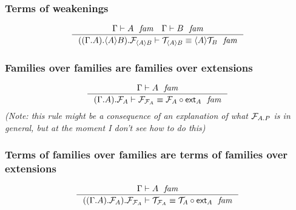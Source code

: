 \subsubsection{Terms of weakenings}
\begin{equation*}
\inference
  { \jfam{\Gamma}{A}
    \jfam{\Gamma}{B}
    }
  { \jfameq
    {{{{\Gamma}{A}}{\ctxwk{A}{B}}}{\mfam{\ctxwk{A}{B}}}}
    {\mtm{\ctxwk{A}{B}}}
    {\ctxwk{A}{\mtm{B}}}
    }
\end{equation*}

\subsubsection{Families over families are families over extensions}
\begin{equation*}
\inference
  { \jfam{\Gamma}{A}
    }
  { \jfameq
      {{{\Gamma}{A}}{\mfam{A}}}
      {\mfam{\mfam{A}}}
      {\jcomp{{A}{\mfam{A}}}{\tfext{A}}{\mfam{A}}}
    }
\end{equation*}
\emph{(Note: this rule might be a consequence of an explanation of what $\mfam{{A}{P}}$
is in general, but at the moment I don't see how to do this)}

\subsubsection{Terms of families over families are terms of families over extensions}
\begin{equation*}
\inference
  { \jfam{\Gamma}{A}
    }
  { \jfameq
      {{{{\Gamma}{A}}{\mfam{A}}}{\mfam{\mfam{A}}}}
      {\mtm{\mfam{A}}}
      {\jcomp{}{\tfext{A}}{\mtm{A}}}
      }
\end{equation*}

